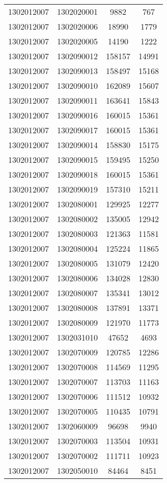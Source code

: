 \begin{longtable}{llcc}
1302012007 & 1302020001 & 9882 & 767\\
1302012007 & 1302020006 & 18990 & 1779\\
1302012007 & 1302020005 & 14190 & 1222\\
1302012007 & 1302090012 & 158157 & 14991\\
1302012007 & 1302090013 & 158497 & 15168\\
1302012007 & 1302090010 & 162089 & 15607\\
1302012007 & 1302090011 & 163641 & 15843\\
1302012007 & 1302090016 & 160015 & 15361\\
1302012007 & 1302090017 & 160015 & 15361\\
1302012007 & 1302090014 & 158830 & 15175\\
1302012007 & 1302090015 & 159495 & 15250\\
1302012007 & 1302090018 & 160015 & 15361\\
1302012007 & 1302090019 & 157310 & 15211\\
1302012007 & 1302080001 & 129925 & 12277\\
1302012007 & 1302080002 & 135005 & 12942\\
1302012007 & 1302080003 & 121363 & 11581\\
1302012007 & 1302080004 & 125224 & 11865\\
1302012007 & 1302080005 & 131079 & 12420\\
1302012007 & 1302080006 & 134028 & 12830\\
1302012007 & 1302080007 & 135341 & 13012\\
1302012007 & 1302080008 & 137891 & 13371\\
1302012007 & 1302080009 & 121970 & 11773\\
1302012007 & 1302031010 & 47652 & 4693\\
1302012007 & 1302070009 & 120785 & 12286\\
1302012007 & 1302070008 & 114569 & 11295\\
1302012007 & 1302070007 & 113703 & 11163\\
1302012007 & 1302070006 & 111512 & 10932\\
1302012007 & 1302070005 & 110435 & 10791\\
1302012007 & 1302060009 & 96698 & 9940\\
1302012007 & 1302070003 & 113504 & 10931\\
1302012007 & 1302070002 & 111711 & 10923\\
1302012007 & 1302050010 & 84464 & 8451\\

\end{longtable}
